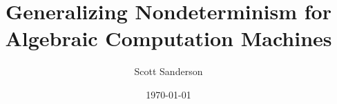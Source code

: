 \documentclass[c]{beamer}
\title{Generalizing Nondeterminism for Algebraic Computation Machines}
\author{Scott Sanderson}
\institute{Department of Mathematics\\Williams College}
\date{\today}
\begin{document}
\theoremstyle{definition}
\newtheorem{proposition}{Proposition}
\newtheorem{proofidea}{Proof Idea}


  






  
  
\end{document}

